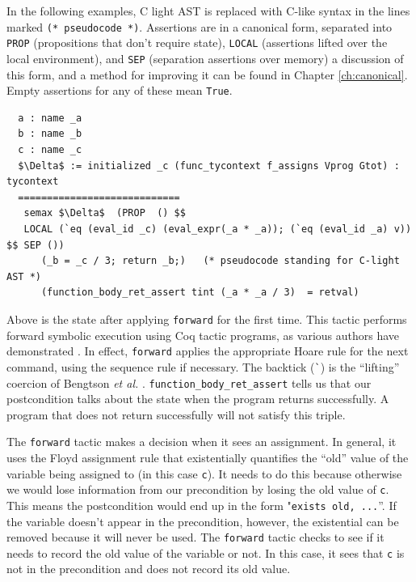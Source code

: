 \documentclass{puthesis}
\begin{document}
In the following examples, C light AST is replaced with C-like syntax
in the lines marked \lstinline|(* pseudocode *)|. Assertions are in a
canonical form, separated into \lstinline|PROP| (propositions that
don't require state), \lstinline|LOCAL| (assertions lifted over the
local environment), and \lstinline|SEP| (separation assertions over
memory) a discussion of this form, and a method for improving it can
be found in Chapter \ref{ch:canonical}. Empty assertions for any of
these mean \lstinline|True|.

\begin{lstlisting}
  a : name _a
  b : name _b
  c : name _c
  $\Delta$ := initialized _c (func_tycontext f_assigns Vprog Gtot) : tycontext
  ============================
   semax $\Delta$  (PROP  () $$ 
   LOCAL (`eq (eval_id _c) (eval_expr(_a * _a)); (`eq (eval_id _a) v)) $$ SEP ()) 
      (_b = _c / 3; return _b;)   (* pseudocode standing for C-light AST *) 
      (function_body_ret_assert tint (_a * _a / 3)  = retval)
\end{lstlisting}

Above is the state after applying \lstinline|forward| for the first
time.  This tactic performs forward symbolic execution using Coq
tactic programs, as various authors have demonstrated
\cite{appel06,chlipala11:pldi,bengtson12,mccreight09}. In effect,
\lstinline|forward| applies the appropriate Hoare rule for the next
command, using the sequence rule if necessary. The backtick
(\lstinline|`|) is the ``lifting'' coercion of Bengtson \emph{et al.}
\cite{bengtson12}.  \lstinline|function_body_ret_assert| tells us that
our postcondition talks about the state when the program returns
successfully. A program that does not return successfully will not
satisfy this triple.

The \lstinline|forward| tactic makes a decision when it sees an assignment. In
general, it uses the Floyd assignment rule that existentially quantifies the
``old'' value of the variable being assigned to (in this case \lstinline|c|). It
needs to do this because otherwise we would lose information from our
precondition by losing the old value of \lstinline|c|. This means the
postcondition would end up in the form "\lstinline|exists old, ...|''. If the
variable doesn't appear in the precondition, however, the existential can be
removed because it will never be used. The \lstinline|forward| tactic checks to
see if it needs to record the old value of the variable or not. In this case,
it sees that \lstinline|c| is not in the precondition and does not record its
old value.
\end{document}
